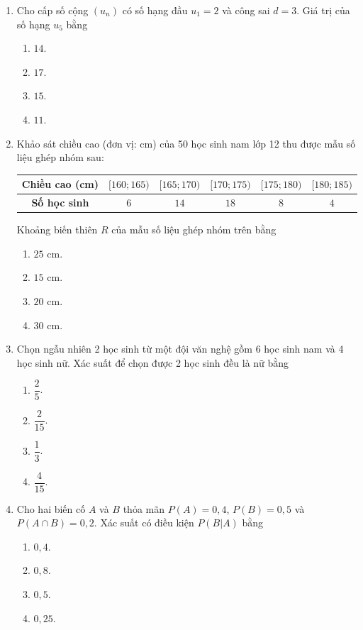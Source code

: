 \documentclass[12pt,a4paper]{article}
\begin{document}
\begin{enumerate}[label=\textbf{Câu \arabic*:}, leftmargin=*]
\item Cho cấp số cộng $(u_n)$ có số hạng đầu $u_1 = 2$ và công sai $d = 3$. Giá trị của số hạng $u_5$ bằng
\begin{enumerate}[label=\Alph*.]
    \item $14$.
    \item $17$.
    \item $15$.
    \item $11$.
\end{enumerate}

\item Khảo sát chiều cao (đơn vị: cm) của 50 học sinh nam lớp 12 thu được mẫu số liệu ghép nhóm sau:
\begin{center}
\begin{tabular}{|c|c|c|c|c|c|}
\hline
\textbf{Chiều cao (cm)} & $[160; 165)$ & $[165; 170)$ & $[170; 175)$ & $[175; 180)$ & $[180; 185)$ \\ \hline
\textbf{Số học sinh} & $6$ & $14$ & $18$ & $8$ & $4$ \\ \hline
\end{tabular}
\end{center}
Khoảng biến thiên $R$ của mẫu số liệu ghép nhóm trên bằng
\begin{enumerate}[label=\Alph*.]
    \item $25\text{ cm}$.
    \item $15\text{ cm}$.
    \item $20\text{ cm}$.
    \item $30\text{ cm}$.
\end{enumerate}

\item Chọn ngẫu nhiên 2 học sinh từ một đội văn nghệ gồm 6 học sinh nam và 4 học sinh nữ. Xác suất để chọn được 2 học sinh đều là nữ bằng
\begin{enumerate}[label=\Alph*.]
    \item $\dfrac{2}{5}$.
    \item $\dfrac{2}{15}$.
    \item $\dfrac{1}{3}$.
    \item $\dfrac{4}{15}$.
\end{enumerate}

\item Cho hai biến cố $A$ và $B$ thỏa mãn $P(A) = 0{,}4$, $P(B) = 0{,}5$ và $P(A \cap B) = 0{,}2$. Xác suất có điều kiện $P(B|A)$ bằng
\begin{enumerate}[label=\Alph*.]
    \item $0{,}4$.
    \item $0{,}8$.
    \item $0{,}5$.
    \item $0{,}25$.
\end{enumerate}


\end{enumerate}
\end{document}
